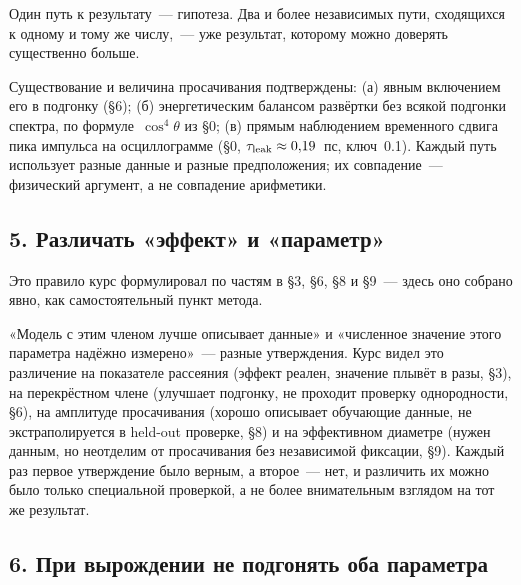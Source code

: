 Один путь к результату~--- гипотеза. Два и более независимых пути, сходящихся к одному и тому же
числу,~--- уже результат, которому можно доверять существенно больше.

\begin{example}
Существование и величина просачивания подтверждены: (а) явным включением его в подгонку
(§6); (б) энергетическим балансом развёртки без всякой подгонки спектра, по формуле~$\cos^4\theta$
из §0; (в) прямым наблюдением временного сдвига пика импульса на осциллограмме (§0,
$\tau_{\mathrm{leak}}\approx0{,}19$~пс, ключ~0.1). Каждый путь использует разные данные и разные предположения;
их совпадение~--- физический аргумент, а не совпадение арифметики.
\end{example}

\subsection{5. Различать «эффект» и «параметр»}
\label{subsec:rule5}

Это правило курс формулировал по частям в §3, §6, §8 и §9~--- здесь оно собрано явно, как
самостоятельный пункт метода.

\begin{tcolorbox}[enhanced,colback=cS1!7,colframe=cS1,boxrule=0pt,leftrule=3pt,arc=1pt]
«Модель с этим членом лучше описывает данные» и «численное значение этого параметра надёжно
измерено»~--- разные утверждения. Курс видел это различение на показателе рассеяния (эффект
реален, значение плывёт в разы, §3), на перекрёстном члене (улучшает подгонку, не проходит
проверку однородности, §6), на амплитуде просачивания (хорошо описывает обучающие данные, не
экстраполируется в held-out проверке, §8) и на эффективном диаметре (нужен данным, но
неотделим от просачивания без независимой фиксации, §9). Каждый раз первое утверждение было
верным, а второе~--- нет, и различить их можно было только специальной проверкой, а не более
внимательным взглядом на тот же результат.
\end{tcolorbox}

\subsection{6. При вырождении не подгонять оба параметра}
\label{subsec:rule6}

